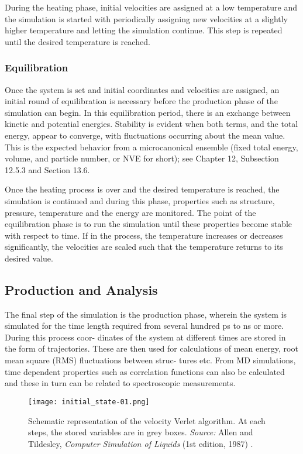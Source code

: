 During the heating phase, initial velocities are assigned at a low temperature and the simulation is started with periodically assigning new velocities at a slightly higher temperature and letting the simulation continue. This step is repeated until the desired temperature is reached.


\subsubsection{Equilibration}
Once the system is set and initial coordinates and velocities are assigned, an initial round of equilibration is necessary before the production phase of the simulation can begin. In this equilibration period, there is an exchange between kinetic and potential energies. Stability is evident when both terms, and the total energy, appear to converge, with fluctuations occurring about the mean value. This is the expected behavior from a microcanonical ensemble (fixed total energy, volume, and particle number, or NVE for short); see Chapter 12, Subsection 12.5.3 and Section 13.6.


Once the heating process is over and the desired temperature is reached, the simulation is continued and during this phase, properties such as structure, pressure, temperature and the energy are monitored. The point of the equilibration phase is to run the simulation until these properties become stable with respect to time. If in the process, the temperature increases or decreases significantly, the velocities are scaled such that the temperature returns to its desired value.

\subsection{Production and Analysis}

The final step of the simulation is the production phase, wherein the system is simulated for the time length required from several hundred ps to ns or more. During this process coor- dinates of the system at different times are stored in the form of trajectories. These are then used for calculations of mean energy, root mean square (RMS) fluctuations between struc- tures etc. From MD simulations, time dependent properties such as correlation functions can also be calculated and these in turn can be related to spectroscopic measurements.

\begin{figure}[H]
\centering
\begin{minipage}[t]{0.8\textwidth}
	\centering
    \texttt{[image: initial\_state-01.png]}
    
    \footnotesize{\caption{Schematic representation of the velocity Verlet algorithm. At each steps, the stored variables are in grey boxes.
    \textit{Source:} Allen and Tildesley, \textit{Computer Simulation of Liquids} (1st edition, 1987) 
    \cite{ref:AllenTildesley_1ed}.}
    \label{fig:symplettic-integrator}
    }
\end{minipage} 
\end{figure}



